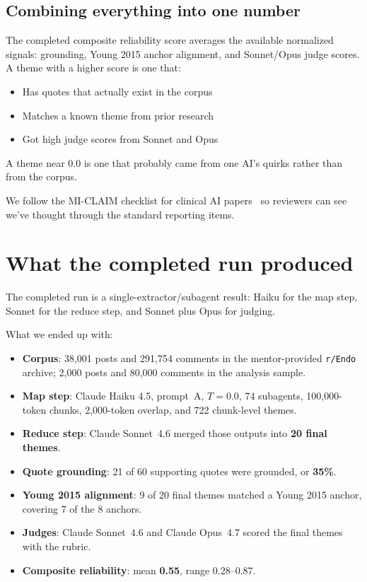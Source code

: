 \documentclass[11pt]{article}
\begin{document}
\subsection{Combining everything into one number}

The completed composite reliability score averages the available
normalized signals: grounding, Young 2015 anchor alignment, and
Sonnet/Opus judge scores. A theme with a higher score is one that:

\begin{itemize}
  \item Has quotes that actually exist in the corpus
  \item Matches a known theme from prior research
  \item Got high judge scores from Sonnet and Opus
\end{itemize}

A theme near 0.0 is one that probably came from one AI's quirks rather
than from the corpus.

We follow the MI-CLAIM checklist for clinical AI
papers~\cite{norgeot2020miclaim} so reviewers can see we've thought
through the standard reporting items.

\section{What the completed run produced}

The completed run is a single-extractor/subagent result: Haiku for the
map step, Sonnet for the reduce step, and Sonnet plus Opus for judging.

What we ended up with:

\begin{itemize}
  \item \textbf{Corpus}: 38{,}001 posts and 291{,}754 comments in the
    mentor-provided \texttt{r/Endo} archive; 2{,}000 posts and
    80{,}000 comments in the analysis sample.
  \item \textbf{Map step}: Claude Haiku 4.5, prompt~A, $T=0.0$, 74
    subagents, 100{,}000-token chunks, 2{,}000-token overlap, and 722
    chunk-level themes.
  \item \textbf{Reduce step}: Claude Sonnet~4.6 merged those outputs
    into \textbf{20 final themes}.
  \item \textbf{Quote grounding}: 21 of 60 supporting quotes were
    grounded, or \textbf{35\%}.
  \item \textbf{Young 2015 alignment}: 9 of 20 final themes matched a
    Young 2015 anchor, covering 7 of the 8 anchors.
  \item \textbf{Judges}: Claude Sonnet~4.6 and Claude Opus~4.7 scored
    the final themes with the rubric.
  \item \textbf{Composite reliability}: mean \textbf{0.55}, range
    0.28--0.87.
\end{itemize}
\end{document}
